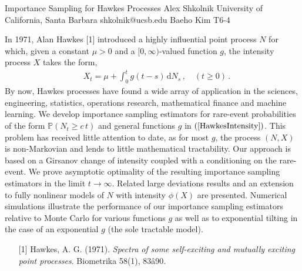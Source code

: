 \begin{talk}
  {Importance Sampling for Hawkes Processes}%
  {Alex Shkolnik}%
  {University of California, Santa Barbara}%
  {shkolnik@ucsb.edu}%
  {Baeho Kim}%
  {T6-4}%
			
In 1971, Alan Hawkes [1] introduced a highly influential point
process $N$ for which, given a constant $\mu > 0$ and a
$[0,\infty)$-valued function $g$, the intensity process $X$
takes the form,
\begin{align} \label{HawkesIntensity} 
 \quad X_t = \mu + \int_0^t g(t-s) \, \mathrm{d} N_s \, ,
 \quad (t \ge 0) \, .
\end{align}
By now, Hawkes processes have found a wide array of application
in the sciences, engineering, statistics, operations research,
mathematical finance and machine learning. We develop importance
sampling estimators for rare-event probabilities of the form
$\mathbb{P}(N_t \ge c \, t)$ and general functions $g$ in
$(\ref{HawkesIntensity})$. This problem has received little 
attention to
date, as for most $g$, the process $(N,X)$ is
non-Markovian and lends to little mathematical tractability.
Our approach is based on a Girsanov change of intensity coupled
with a conditioning on the rare-event.  We prove asymptotic
optimality of the resulting importance sampling estimators in
the limit $t \to \infty$. Related large deviations results and
an extension to fully nonlinear models of $N$ with intensity
$\phi(X)$ are presented.  Numerical simulations illustrate the
performance of our importance sampling estimators relative to
Monte Carlo for various functions $g$ as well as to exponential
tilting in the case of an exponential $g$ (the sole tractable
model).


\medskip


\begin{enumerate}
	\item[{[1]}] Hawkes, A. G. (1971). {\it Spectra of some 
self-exciting and mutually exciting point processes}. 
Biometrika 58(1), 83â90.
\end{enumerate}


\end{talk}

